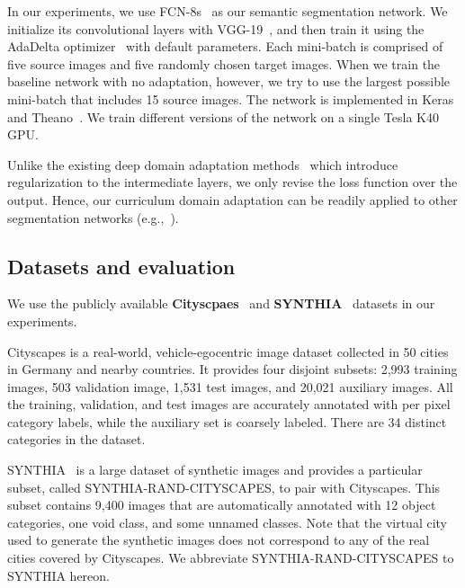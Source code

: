 In our experiments, we use FCN-8s~\cite{long_fully_2015} as our semantic segmentation network. We initialize its convolutional layers with VGG-19~\cite{SimonyanX14Very}, and then train it using the AdaDelta optimizer~\cite{zeiler_adadelta:_2012} with default parameters. Each mini-batch is comprised of five source images and five randomly chosen target images. When we train the baseline network with no adaptation, however, we try to use the largest possible mini-batch that includes 15 source images. The network is implemented in Keras~\cite{chollet_keras_2015} and Theano~\cite{al-rfou_theano:_2016}. We train different versions of the network on a single Tesla K40 GPU.


Unlike the existing deep domain adaptation methods~\cite{GaninICML15Unsupervised,GaninX15Domainadversarial,LongICML15Learning,hoffman_fcns_2016} which introduce regularization to the intermediate layers, we only revise the loss function over the output.  Hence, our curriculum domain adaptation can be readily applied to other segmentation networks (e.g.,~\cite{NohICCV15Learning,chen_semantic_2014}).


\subsection{Datasets and evaluation}
We use the publicly available \textbf{Cityscpaes}~\cite{cordts_cityscapes_2016} and \textbf{SYNTHIA}~\cite{ros_synthia_2016} datasets in our experiments. 

{Cityscapes} is a real-world, vehicle-egocentric image dataset collected in 50 cities in Germany and nearby countries. It provides four disjoint subsets: 2,993 training images, 503 validation image, 1,531 test images, and 20,021 auxiliary images. All the training, validation, and test images are accurately annotated with per pixel category labels, while the auxiliary set is coarsely labeled.  There are 34 distinct categories in the dataset.

{SYNTHIA}~\cite{ros_synthia_2016} is a large dataset of synthetic images and provides a particular subset, called SYNTHIA-RAND-CITYSCAPES, to pair with {Cityscapes}. This subset contains 9,400  images that are automatically annotated with 12 object categories,  one void class, and some unnamed classes. Note that the virtual city used to generate the synthetic images does not correspond to any of the real cities covered by {Cityscapes}. We abbreviate SYNTHIA-RAND-CITYSCAPES to {SYNTHIA} hereon.
\vspace{-10pt}

